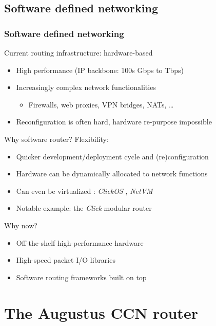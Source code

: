 \subsection{Software defined networking}
\begin{frame}[fragile]
  \frametitle{Software defined networking}
  Current routing infrastructure: hardware-based
  \begin{itemize}
    \item High performance (IP backbone: 100s Gbps to Tbps)
    \item Increasingly complex network functionalities %
      \begin{itemize}
        \item Firewalls, web proxies, VPN bridges, NATs, \dots
      \end{itemize}
    \item Reconfiguration is often hard, hardware re-purpose impossible
  \end{itemize}
  Why software router? Flexibility:
  \begin{itemize}
    \item Quicker development/deployment cycle and (re)configuration
    \item Hardware can be dynamically allocated to network functions
    \item Can even be virtualized%
      : \textit{ClickOS} \cite{clickos}, \textit{NetVM} \cite{netvm}
    \item Notable example: the \textit{Click} modular router \cite{click}
  \end{itemize}
  Why now?
  \begin{itemize}
    \item Off-the-shelf high-performance hardware
    \item High-speed packet I/O libraries%
      \ \cite{dpdk,netmap}
    \item Software routing frameworks built on top \cite{fastclick,nba}
  \end{itemize}
\end{frame}


\section{The Augustus CCN router}

